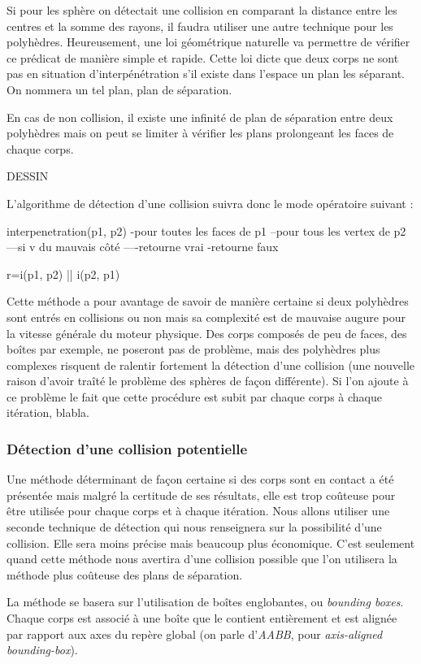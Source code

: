 \documentclass[twocolumn]{article}
\begin{document}
Si pour les sphère on détectait une collision en comparant la distance entre les centres et la somme des rayons, il faudra utiliser une autre technique pour les polyhèdres. Heureusement, une loi géométrique naturelle va permettre de vérifier ce prédicat de manière simple et rapide. Cette loi dicte que deux corps ne sont pas en situation d'interpénétration s'il existe dans l'espace un plan les séparant. On nommera un tel plan, plan de séparation.

En cas de non collision, il existe une infinité de plan de séparation entre deux polyhèdres mais on peut se limiter à vérifier les plans prolongeant les faces de chaque corps.

DESSIN

L'algorithme de détection d'une collision suivra donc le mode opératoire suivant :

interpenetration(p1, p2)
-pour toutes les faces de p1
--pour tous les vertex de p2
---si v du mauvais côté
----retourne vrai
-retourne faux

r=i(p1, p2) || i(p2, p1)

Cette méthode a pour avantage de savoir de manière certaine si deux polyhèdres sont entrés en collisions ou non mais sa complexité est de mauvaise augure pour la vitesse générale du moteur physique. Des corps composés de peu de faces, des boîtes par exemple, ne poseront pas de problème, mais des polyhèdres plus complexes risquent de ralentir fortement la détection d'une collision (une nouvelle raison d'avoir traîté le problème des sphères de façon différente). Si l'on ajoute à ce problème le fait que cette procédure est subit par chaque corps à chaque itération, blabla.

\subsubsection{Détection d'une collision potentielle}

Une méthode déterminant de façon certaine si des corps sont en contact a été présentée mais malgré la certitude de ses résultats, elle est trop coûteuse pour être utilisée pour chaque corps et à chaque itération. Nous allons utiliser une seconde technique de détection qui nous renseignera sur la possibilité d'une collision. Elle sera moins précise mais beaucoup plus économique. C'est seulement quand cette méthode nous avertira d'une collision possible que l'on utilisera la méthode plus coûteuse des plans de séparation.

La méthode se basera sur l'utilisation de boîtes englobantes, ou \textit{bounding boxes}. Chaque corps est associé à une boîte que le contient entièrement et est alignée par rapport aux axes du repère global (on parle d'\textit{AABB}, pour \textit{axis-aligned bounding-box}). 
\end{document}
